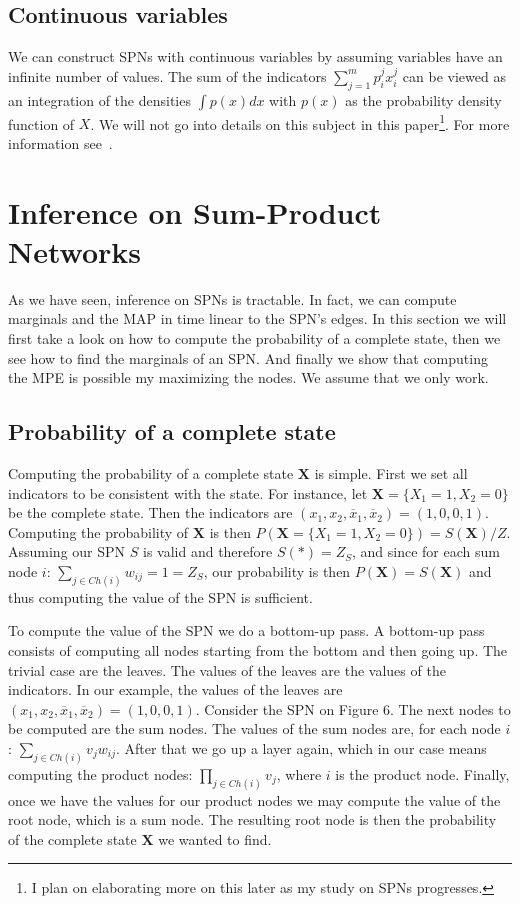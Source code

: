 \documentclass[a4paper,10pt]{article}
\theoremstyle{plain}
\begin{document}
\subsection{Continuous variables}

We can construct SPNs with continuous variables by assuming variables have an infinite number of
values. The sum of the indicators $\sum_{j=1}^m p_i^j x_i^j$ can be viewed as an integration of the
densities $\int p(x)dx$ with $p(x)$ as the probability density function of $X$. We will not go into
details on this subject in this paper\footnote{I plan on elaborating more on this later as my
study on SPNs progresses.}. For more information see~\cite{poon-domingos}.

\newpage

\section{Inference on Sum-Product Networks}

As we have seen, inference on SPNs is tractable. In fact, we can compute marginals and the MAP in
time linear to the SPN's edges. In this section we will first take a look on how to compute the
probability of a complete state, then we see how to find the marginals of an SPN\@. And finally
we show that computing the MPE is possible my maximizing the nodes. We assume that we only work.

\subsection{Probability of a complete state}

Computing the probability of a complete state $\mathbf{X}$ is simple. First we set all indicators
to be consistent with the state. For instance, let $\mathbf{X}=\{X_1=1,X_2=0\}$ be the complete
state. Then the indicators are $(x_1,x_2,\overline{x}_1,\overline{x}_2)=(1, 0, 0, 1)$. Computing
the probability of $\mathbf{X}$ is then $P(\mathbf{X}=\{X_1=1,X_2=0\})=S(\mathbf{X})/Z$. Assuming
our SPN $S$ is valid and therefore $S(*)=Z_S$, and since for each sum node $i$: $\sum_{j\in Ch(i)}
w_{ij}=1=Z_S$, our probability is then $P(\mathbf{X})=S(\mathbf{X})$ and thus computing the value
of the SPN is sufficient.

To compute the value of the SPN we do a bottom-up pass. A bottom-up pass consists of computing all
nodes starting from the bottom and then going up. The trivial case are the leaves. The values of
the leaves are the values of the indicators. In our example, the values of the leaves are
$(x_1,x_2,\overline{x}_1,\overline{x}_2)=(1,0,0,1)$. Consider the SPN on Figure 6. The next nodes
to be computed are the sum nodes. The values of the sum nodes are, for each node $i$: $\sum_{j\in
Ch(i)}v_j w_{ij}$. After that we go up a layer again, which in our case means computing the product
nodes: $\prod_{j\in Ch(i)}v_j$, where $i$ is the product node. Finally, once we have the values for
our product nodes we may compute the value of the root node, which is a sum node. The resulting
root node is then the probability of the complete state $\mathbf{X}$ we wanted to find.
\end{document}
